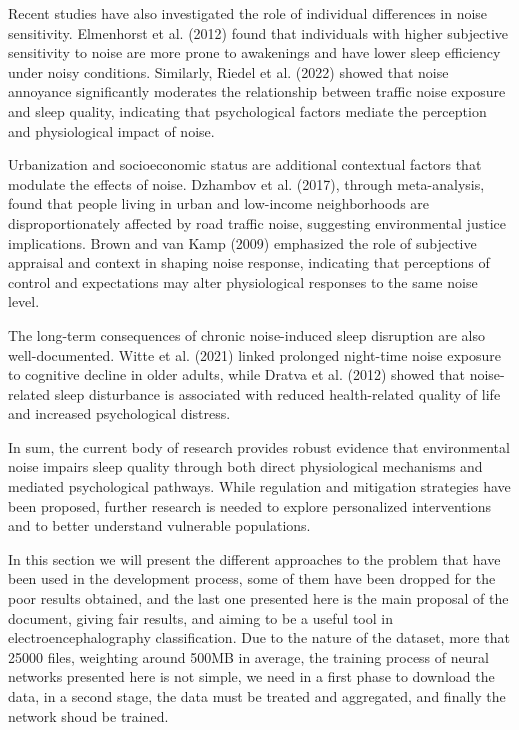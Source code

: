 Recent studies have also investigated the role of individual differences in noise sensitivity. Elmenhorst et al. (2012) found that individuals with higher subjective sensitivity to noise are more prone to awakenings and have lower sleep efficiency under noisy conditions. Similarly, Riedel et al. (2022) showed that noise annoyance significantly moderates the relationship between traffic noise exposure and sleep quality, indicating that psychological factors mediate the perception and physiological impact of noise.

Urbanization and socioeconomic status are additional contextual factors that modulate the effects of noise. Dzhambov et al. (2017), through meta-analysis, found that people living in urban and low-income neighborhoods are disproportionately affected by road traffic noise, suggesting environmental justice implications. Brown and van Kamp (2009) emphasized the role of subjective appraisal and context in shaping noise response, indicating that perceptions of control and expectations may alter physiological responses to the same noise level.

The long-term consequences of chronic noise-induced sleep disruption are also well-documented. Witte et al. (2021) linked prolonged night-time noise exposure to cognitive decline in older adults, while Dratva et al. (2012) showed that noise-related sleep disturbance is associated with reduced health-related quality of life and increased psychological distress.

In sum, the current body of research provides robust evidence that environmental noise impairs sleep quality through both direct physiological mechanisms and mediated psychological pathways. While regulation and mitigation strategies have been proposed, further research is needed to explore personalized interventions and to better understand vulnerable populations.

In this section we will present the different approaches to the problem that have been used in the development process, some of them have been dropped for the poor results obtained, and the last one presented here is the main proposal of the document, giving fair results, and aiming to be a useful tool in electroencephalography classification. Due to the nature of the dataset, more that 25000 files, weighting around 500MB in average, the training process of neural networks presented here is not simple, we need in a first phase to download the data, in a second stage, the data must be treated and aggregated, and finally the network shoud be trained.

